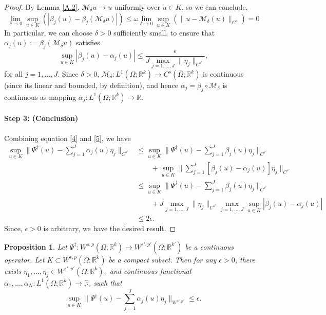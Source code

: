\documentclass[reqno]{amsart}
\theoremstyle{plain}
\newtheorem{prop}{Proposition}
\theoremstyle{definition}
\newcommand{\bb}[1]{\mathbb{#1}}
\newcommand{\cal}[1]{\mathcal{#1}}
\begin{document}
\begin{proof}
    By Lemma \ref{A.2}, $\cal M_\delta u \to u$ uniformly over $u \in K$, so we can conclude,
    $$ \lim_{\delta \to 0} \sup\limits_{u \in K}(|\beta_j(u) - \beta_j(\cal M_\delta u)|) \leq \omega \lim_{\delta \to 0}\sup\limits_{u \in K} \left(\|u - \cal M_\delta (u)\|_{C^s}\right) = 0$$
    In particular, we can choose $\delta > 0$ sufficiently small, to ensure that $\alpha_j(u) := \beta_j(\cal M_\delta u)$ satisfies 
    \begin{equation} \label{5}
        \sup_{u \in K}|\beta_j(u) - \alpha_j(u)| \leq \frac{\epsilon}{J \max_{j = 1,\dots,J}\|\eta_j\|_{C^{s'}}},
    \end{equation}
    for all $j = 1, \dots, J$. Since $\delta > 0$, $\cal M_\delta : L^1(\Omega;\bb R^k) \to C^s(\overline{\Omega};\bb R^k)$ is continuous (since its linear and bounded, by definition), and hence $\alpha_j = \beta_j \circ \cal M_\delta$ is continuous as mapping $\alpha_j : L^1(\Omega;\bb R^k) \to \bb R.$
    \paragraph{\bf Step 3: (Conclusion)} Combining equation \ref{4} and \ref{5}, we have 
    $$
    \begin{aligned}
        \sup\limits_{u \in K} \|\Psi^\dag(u) - \sum_{j=1}^{J} \alpha_j(u)\eta_j\|_{C^{s'}} &\leq \sup\limits_{u \in K} \|\Psi^\dag(u) - \sum_{j=1}^{J}\beta_j(u)\eta_j\|_{C^{s'}}\\
        & \qquad + \sup\limits_{u \in K} \|\sum_{j=1}^{J}[\beta_j(u) - \alpha_j(u)]\eta_j\|_{C^{s'}}\\
        & \leq \sup\limits_{u \in K} \|\Psi^\dag(u) - \sum_{j=1}^{J} \beta_j(u) \eta_j\|_{C^{s'}} \\
        &\qquad + J \max\limits_{j=1,\dots,J} \|\eta_j\|_{C^{s'}} \max\limits_{j=1,\dots,J} \sup\limits_{u \in K} |\beta_j(u) - \alpha_j(u)| \\
        & \leq 2\epsilon.
    \end{aligned}
    $$
    Since, $\epsilon > 0$ is arbitrary, we have the desired result. 
\end{proof}
\begin{prop}
    Let $\Psi^\dag : W^{s,p}(\Omega; \bb R^k) \to W^{s',p'}(\Omega;\bb R^{k'})$ be a continuous operator. Let $K \subset W^{s,p}(\Omega; \bb R^k)$ be a compact subset. Then for any $\epsilon > 0$, there exists $\eta_1, \dots, \eta_j \in W^{s',p'}(\Omega; \bb R^k),$ and continuous functional $\alpha_1, \dots, \alpha_N: L^1(\Omega; \bb R^k) \to \bb R$, such that 
    $$ \sup\limits_{u \in K} \|\Psi^\dag(u) - \sum_{j=1}^{J} \alpha_j(u)\eta_j\|_{W^{s',p'}} \leq \epsilon.$$
\end{prop}
\end{document}
